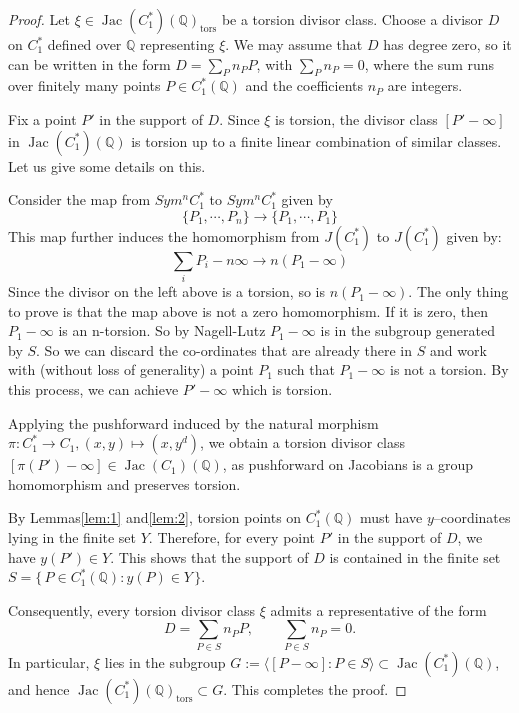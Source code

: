 \documentclass[12pt, reqno]{amsart}
\numberwithin{equation}{section}
\theoremstyle{definition}
\theoremstyle{nodefstyle}
\newcommand{\Jac}{\operatorname{Jac}}
\newcommand{\tors}{\operatorname{tors}}
\begin{document}
\begin{proof}
Let $\xi \in \Jac(C_1^*)(\mathbb{Q})_{\tors}$ be a torsion divisor class. 
Choose a divisor $D$ on $C_1^*$ defined over $\mathbb{Q}$ representing $\xi$. 
We may assume that $D$ has degree zero, so it can be written in the form $D=\sum_{P} n_P P$, with $\sum_{P} n_P = 0$, where the sum runs over finitely many points $P \in C_1^*(\mathbb{Q})$ and the coefficients $n_P$ are integers.

Fix a point $P'$ in the support of $D$. 
Since $\xi$ is torsion, the divisor class $[P'-\infty]$ in $\Jac(C_1^*)(\mathbb{Q})$ is torsion up to a finite linear combination of similar classes. Let us give some details on this.

Consider the map from $Sym^n C_1^* $ to $Sym^n C_1^*$ given by 
$$\{P_1,\cdots, P_n\}\to \{P_1,\cdots, P_1\}$$
This map further induces the homomorphism from $J(C_1^*)$ to $J(C_1^*)$ given by:
$$\sum_i P_i-n\infty\to n(P_1-\infty)$$
Since the divisor on the left above is a torsion, so is $n(P_1-\infty)$. The only thing to prove is that the map above is not a zero homomorphism. If it is zero, then $P_1-\infty$ is an n-torsion. So by Nagell-Lutz $P_1-\infty$ is in the subgroup generated by  $S$. So we can discard the co-ordinates that are already there in $S$ and work with (without loss of generality) a point $P_1$ such that $P_1-\infty$ is not a torsion. By this process, we can achieve $P'-\infty$ which is torsion.


Applying the pushforward induced by the natural morphism $\pi : C_1^* \longrightarrow C_1, (x,y)\longmapsto (x,y^d)$, we obtain a torsion divisor class $[\pi(P')-\infty] \in \Jac(C_1)(\mathbb{Q})$, as pushforward on Jacobians is a group homomorphism and preserves torsion.

By Lemmas\autoref{lem:1} and\autoref{lem:2}, torsion points on $C_1^*(\mathbb{Q})$ must have $y$--coordinates lying in the finite set $Y$. 
Therefore, for every point $P'$ in the support of $D$, we have $y(P') \in Y$. 
This shows that the support of $D$ is contained in the finite set $S=\{\, P \in C_1^*(\mathbb{Q}) : y(P)\in Y \,\}$.

Consequently, every torsion divisor class $\xi$ admits a representative of the form
\[
D=\sum_{P\in S} n_P P,
\qquad \sum_{P\in S} n_P = 0.
\]
In particular, $\xi$ lies in the subgroup $G := \big\langle [P-\infty] : P\in S \big\rangle \subset \Jac(C_1^*)(\mathbb{Q})$,
and hence $\Jac(C_1^*)(\mathbb{Q})_{\tors} \subset G$. This completes the proof.
\end{proof}
\end{document}
